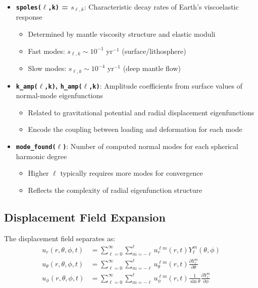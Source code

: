 \documentclass{article}
\begin{document}
\begin{itemize}
\item \textbf{{\tt spoles($\ell$,k)} = $s_{\ell,k}$}: Characteristic decay rates of Earth's viscoelastic response
  \begin{itemize}
  \item Determined by mantle viscosity structure and elastic moduli
  \item Fast modes: $s_{\ell,k} \sim 10^{-1}$ yr$^{-1}$ (surface/lithosphere)
  \item Slow modes: $s_{\ell,k} \sim 10^{-4}$ yr$^{-1}$ (deep mantle flow)
  \end{itemize}

\item \textbf{{\tt k\_amp($\ell$,k)}, {\tt h\_amp($\ell$,k)}}: Amplitude coefficients from surface values of normal-mode eigenfunctions
  \begin{itemize}
  \item Related to gravitational potential and radial displacement eigenfunctions
  \item Encode the coupling between loading and deformation for each mode
  \end{itemize}

\item \textbf{{\tt mode\_found($\ell$)}}: Number of computed normal modes for each spherical harmonic degree
  \begin{itemize}
  \item Higher $\ell$ typically requires more modes for convergence
  \item Reflects the complexity of radial eigenfunction structure
  \end{itemize}
\end{itemize}

\subsection{Displacement Field Expansion}

The displacement field separates as:
\begin{align}
u_r(r,\theta,\phi,t) &= \sum_{\ell=0}^{\infty} \sum_{m=-\ell}^{\ell} u_r^{\ell m}(r,t) Y_\ell^m(\theta,\phi) \\
u_\theta(r,\theta,\phi,t) &= \sum_{\ell=0}^{\infty} \sum_{m=-\ell}^{\ell} u_\theta^{\ell m}(r,t) \frac{\partial Y_\ell^m}{\partial \theta} \\
u_\phi(r,\theta,\phi,t) &= \sum_{\ell=0}^{\infty} \sum_{m=-\ell}^{\ell} u_\phi^{\ell m}(r,t) \frac{1}{\sin\theta}\frac{\partial Y_\ell^m}{\partial \phi}
\end{align}
\end{document}
